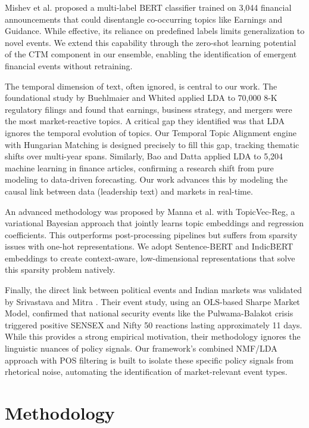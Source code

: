 \documentclass[11pt]{article}
\begin{document}
Mishev et al. \cite{mishev2022} proposed a multi-label BERT classifier trained on 3,044 financial announcements that could disentangle co-occurring topics like Earnings and Guidance. While effective, its reliance on predefined labels limits generalization to novel events. We extend this capability through the zero-shot learning potential of the CTM component in our ensemble, enabling the identification of emergent financial events without retraining.

The temporal dimension of text, often ignored, is central to our work. The foundational study by Buehlmaier and Whited \cite{buehlmaier2018} applied LDA to 70,000 8-K regulatory filings and found that earnings, business strategy, and mergers were the most market-reactive topics. A critical gap they identified was that LDA ignores the temporal evolution of topics. Our Temporal Topic Alignment engine with Hungarian Matching is designed precisely to fill this gap, tracking thematic shifts over multi-year spans. Similarly, Bao and Datta \cite{bao2019} applied LDA to 5,204 machine learning in finance articles, confirming a research shift from pure modeling to data-driven forecasting. Our work advances this by modeling the causal link between data (leadership text) and markets in real-time.

An advanced methodology was proposed by Manna et al. \cite{manna2022} with TopicVec-Reg, a variational Bayesian approach that jointly learns topic embeddings and regression coefficients. This outperforms post-processing pipelines but suffers from sparsity issues with one-hot representations. We adopt Sentence-BERT and IndicBERT embeddings to create context-aware, low-dimensional representations that solve this sparsity problem natively.

Finally, the direct link between political events and Indian markets was validated by Srivastava and Mitra \cite{srivastava2019}. Their event study, using an OLS-based Sharpe Market Model, confirmed that national security events like the Pulwama-Balakot crisis triggered positive SENSEX and Nifty 50 reactions lasting approximately 11 days. While this provides a strong empirical motivation, their methodology ignores the linguistic nuances of policy signals. Our framework’s combined NMF/LDA approach with POS filtering is built to isolate these specific policy signals from rhetorical noise, automating the identification of market-relevant event types.

\section{Methodology}
\label{sec:methodology}
\end{document}
